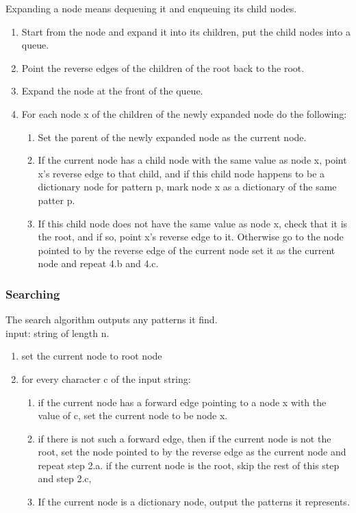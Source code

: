 \documentclass[paper=a4, fontsize=11pt]{scrartcl} %
\numberwithin{equation}{section} %
\numberwithin{figure}{section} %
\numberwithin{table}{section} %
\begin{document}
Expanding a node means dequeuing it and enqueuing its child nodes.
\begin{enumerate}
\item Start from the node and expand it into its children, put the child nodes into a queue.

\item Point the reverse edges of the children of the root back to the root.

\item Expand the node at the front of the queue.

\item For each node x of the children of the newly expanded node do the following:

\begin{enumerate}
        \item Set the parent of the newly expanded node as the current node.

        \item If the current node has a child node with the same value as node x, point x's reverse edge to that child, and if this child node happens to be a dictionary node for pattern p, mark node x as a dictionary of the same patter p. 
	\item If this child node does not have the same value as node x, check that it is the root, and if so, point x's reverse edge to it. Otherwise go to the node pointed to by the reverse edge of the current node set it as the current node and repeat 4.b and 4.c.
\end{enumerate}
\end{enumerate}

\subsubsection{Searching}
The search algorithm outputs any patterns it find.\\
input: string of length n.\\
\begin{enumerate}
\item set the current node to root node
\item for every character c of the input string:\\
\begin{enumerate}
\item if the current node has a forward edge pointing to a node x with the value of c, set the current node to be node x. 
\item if there is not such a forward edge, then if the current node is not the root, set the node pointed to by the reverse edge as the current node and repeat step 2.a. if the current node is the root, skip the rest of this step and step 2.c,   
\item If the current node is a dictionary node, output the patterns it represents.
\end{enumerate}
\end{enumerate}
\end{document}
